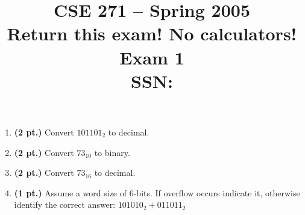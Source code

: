 \documentclass{article}
\begin{document}
\newcommand{\SOPmin}{${\rm SOP}_{\rm min} \ $}
\newcommand{\POSmin}{${\rm POS}_{\rm min} \ $}
\newcommand{\bs}{\backslash}


\title{
\Huge{CSE 271 -- Spring 2005}\\
\normalsize{Return this exam!  No calculators!}\\
\normalsize{Exam 1}\\
SSN:}
\date{}

\maketitle{}

\begin{enumerate}
\item {\bf (2 pt.)} Convert $101101_2$ to decimal.

\item {\bf (2 pt.)} Convert $73_{10}$ to binary.

\item {\bf (2 pt.)} Convert $73_{16}$ to decimal.
\pagebreak

\item {\bf (1 pt.)} Assume a word size of 6-bits.  If overflow occurs 
indicate it, otherwise identify the correct answer: $101010_2 + 011011_2$


\end{enumerate}
\end{document}
